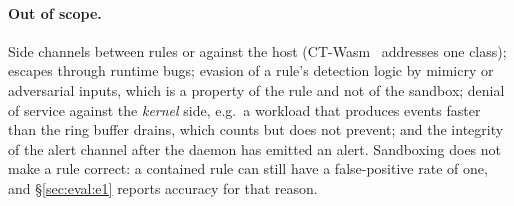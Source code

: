 \paragraph{Out of scope.}
Side channels between rules or against the host (CT-Wasm~\cite{ct-wasm}
addresses one class); escapes through runtime bugs; evasion of a rule's
detection logic by mimicry or adversarial inputs, which is a property of the
rule and not of the sandbox; denial of service against the \emph{kernel}
side, e.g.\ a workload that produces events faster than the ring buffer
drains, which \sys counts but does not prevent; and the integrity of the
alert channel after the daemon has emitted an alert. Sandboxing does not
make a rule correct: a contained rule can still have a false-positive rate
of one, and \S\ref{sec:eval:e1} reports accuracy for that reason.

